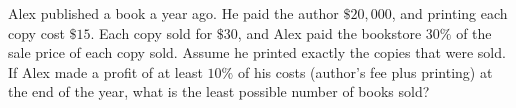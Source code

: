 Alex published a book a year ago. He paid the author $\$20{,}000$, and printing each copy cost $\$15$. Each copy sold for $\$30$, and Alex paid the bookstore $30\%$ of the sale price of each copy sold. Assume he printed exactly the copies that were sold. If Alex made a profit of at least $10\%$ of his costs (author's fee plus printing) at the end of the year, what is the least possible number of books sold?
